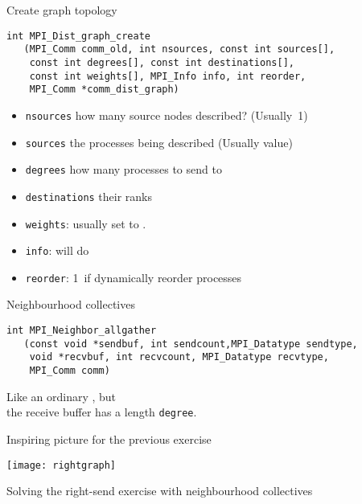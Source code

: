 \begin{frame}[containsverbatim]{Create graph topology}
\lstset{language=C}
\begin{lstlisting}
int MPI_Dist_graph_create
   (MPI_Comm comm_old, int nsources, const int sources[],
    const int degrees[], const int destinations[], 
    const int weights[], MPI_Info info, int reorder,
    MPI_Comm *comm_dist_graph)
\end{lstlisting}
\begin{itemize}
\item \lstinline{nsources} how many source nodes described? (Usually~1)
\item \lstinline{sources} the processes being described (Usually
   value)
\item \lstinline{degrees} how many processes to send to
\item \lstinline{destinations} their ranks
\item \lstinline{weights}: usually set to .
\item \lstinline{info}:  will do
\item \lstinline{reorder}: 1~if dynamically reorder processes
\end{itemize}
\end{frame}

\begin{frame}[containsverbatim]{Neighbourhood collectives}
\begin{lstlisting}
int MPI_Neighbor_allgather
   (const void *sendbuf, int sendcount,MPI_Datatype sendtype,
    void *recvbuf, int recvcount, MPI_Datatype recvtype,
    MPI_Comm comm)
\end{lstlisting}
Like an ordinary , but\\
the receive buffer has a length \lstinline{degree}.
\end{frame}

\begin{exerciseframe}[rightgraph]
  \hyperlink{exserialsend}{}

  
\end{exerciseframe}

\begin{frame}{Inspiring picture for the previous exercise}
  \label{fig:rightgraph}

  \texttt{[image: rightgraph]}

  Solving the right-send exercise with neighbourhood
  collectives
\end{frame}

\endinput

\begin{frame}[containsverbatim]{}
\end{frame}

